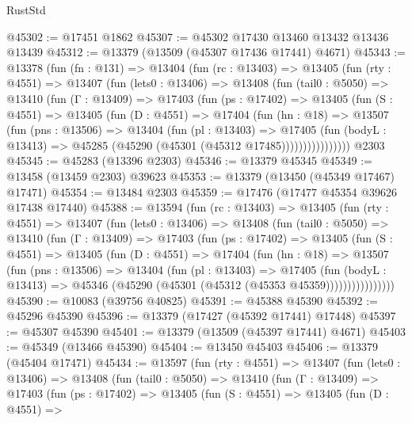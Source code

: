 \begin{lexlean}{RustStd}
\begin{coremodule}
@45302 := @17451 @1862
@45307 := @45302 @17430 @13460 @13432 @13436 @13439
@45312 := @13379 (@13509 (@45307 @17436 @17441) @4671)
@45343 := @13378
    (fun (fn : @131) =>
    @13404
      (fun (rc : @13403) =>
      @13405
        (fun (rty : @4551) =>
        @13407
          (fun (lets0 : @13406) =>
          @13408
            (fun (tail0 : @5050) =>
            @13410
              (fun (Γ : @13409) =>
              @17403
                (fun (ps : @17402) =>
                @13405
                  (fun (S : @4551) =>
                  @13405
                    (fun (D : @4551) =>
                    @17404
                      (fun (hn : @18) =>
                      @13507
                        (fun (pns : @13506) =>
                        @13404
                          (fun (pl : @13403) =>
                          @17405
                            (fun (bodyL : @13413) =>
                            @45285 (@45290 (@45301 (@45312 @17485))))))))))))))))
    @2303
@45345 := @45283 (@13396 @2303)
@45346 := @13379 @45345
@45349 := @13458 (@13459 @2303) @39623
@45353 := @13379 (@13450 (@45349 @17467) @17471)
@45354 := @13484 @2303
@45359 := @17476 (@17477 @45354 @39626 @17438 @17440)
@45388 := @13594
    (fun (rc : @13403) =>
    @13405
      (fun (rty : @4551) =>
      @13407
        (fun (lets0 : @13406) =>
        @13408
          (fun (tail0 : @5050) =>
          @13410
            (fun (Γ : @13409) =>
            @17403
              (fun (ps : @17402) =>
              @13405
                (fun (S : @4551) =>
                @13405
                  (fun (D : @4551) =>
                  @17404
                    (fun (hn : @18) =>
                    @13507
                      (fun (pns : @13506) =>
                      @13404
                        (fun (pl : @13403) =>
                        @17405
                          (fun (bodyL : @13413) =>
                          @45346 (@45290 (@45301 (@45312 (@45353 @45359))))))))))))))))
@45390 := @10083 (@39756 @40825)
@45391 := @45388 @45390
@45392 := @45296 @45390
@45396 := @13379 (@17427 (@45392 @17441) @17448)
@45397 := @45307 @45390
@45401 := @13379 (@13509 (@45397 @17441) @4671)
@45403 := @45349 (@13466 @45390)
@45404 := @13450 @45403
@45406 := @13379 (@45404 @17471)
@45434 := @13597
    (fun (rty : @4551) =>
    @13407
      (fun (lets0 : @13406) =>
      @13408
        (fun (tail0 : @5050) =>
        @13410
          (fun (Γ : @13409) =>
          @17403
            (fun (ps : @17402) =>
            @13405
              (fun (S : @4551) =>
              @13405
                (fun (D : @4551) =>

\end{coremodule}
\end{lexlean}
